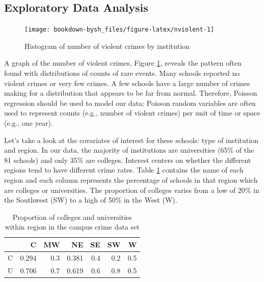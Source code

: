 \documentclass[
]{krantz}
\begin{document}
\hypertarget{exploratory-data-analysis}{%
\subsection{Exploratory Data Analysis}\label{exploratory-data-analysis}}

\begin{figure}

{\centering \texttt{[image: bookdown-bysh\_files/figure-latex/nviolent-1]} 

}

\caption{Histogram of number of violent crimes by institution}\label{fig:nviolent}
\end{figure}

A graph of the number of violent crimes, Figure \ref{fig:nviolent}, reveals the pattern often found with distributions of counts of rare events. Many schools reported no violent crimes or very few crimes. A few schools have a large number of crimes making for a distribution that appears to be far from normal. Therefore, Poisson regression should be used to model our data; Poisson random variables are often used to represent counts (e.g., number of violent crimes) per unit of time or space (e.g., one year).

Let's take a look at the covariates of interest for these schools: type of institution and region. In our data, the majority of institutions are universities (65\% of the 81 schools) and only 35\% are colleges. Interest centers on whether the different regions tend to have different crime rates. Table \ref{tab:regions} contains the name of each region and each column represents the percentage of schools in that region which are colleges or universities. The proportion of colleges varies from a low of 20\% in the Southwest (SW) to a high of 50\% in the West (W).

\begin{table}[t]

\caption{\label{tab:regions}Proportion of colleges and universities within region in the campus crime data set}
\centering
\begin{tabular}{lrrrrrr}
\toprule
  & C & MW & NE & SE & SW & W\\
\midrule
C & 0.294 & 0.3 & 0.381 & 0.4 & 0.2 & 0.5\\
U & 0.706 & 0.7 & 0.619 & 0.6 & 0.8 & 0.5\\
\bottomrule
\end{tabular}
\end{table}
\end{document}
